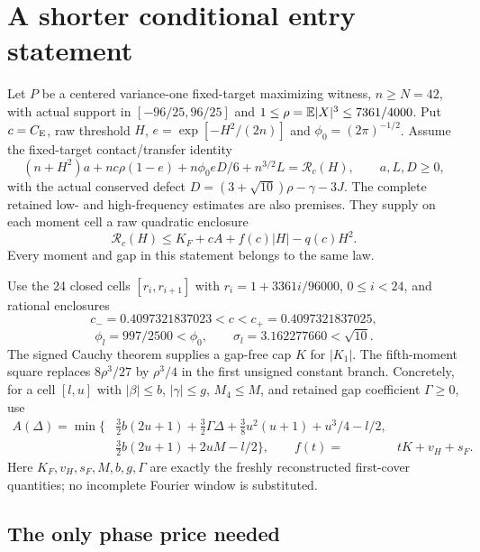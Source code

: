 \section{A shorter conditional entry statement}

Let $P$ be a centered variance-one fixed-target maximizing witness,
$n\ge N=42$, with actual support in $[-96/25,96/25]$ and
$1\le\rho=\mathbb E|X|^3\le7361/4000$. Put $c=C_{\mathrm E}$, raw threshold $H$,
$e=\exp[-H^2/(2n)]$ and $\phi_0=(2\pi)^{-1/2}$.
Assume the fixed-target contact/transfer identity
\begin{equation}\label{twopass:identity}
 (n+H^2)a+nc\rho(1-e)+n\phi_0 eD/6+n^{3/2}L=\mathcal R_c(H),
 \qquad a,L,D\ge0,
\end{equation}
with the actual conserved defect
$D=(3+\sqrt{10})\rho-\gamma-3J$.
The complete retained low- and high-frequency estimates are also premises.
They supply on each moment cell a raw quadratic enclosure
\begin{equation}\label{twopass:raw}
 \mathcal R_c(H)\le K_F+cA+f(c)|H|-q(c)H^2.
\end{equation}
Every moment and gap in this statement belongs to the same law.

Use the 24 closed cells $[r_i,r_{i+1}]$ with
$r_i=1+3361i/96000$, $0\le i<24$, and rational enclosures
\[
 c_-=0.4097321837023<c<c_+=0.4097321837025,
\]
\[
 \phi_l=997/2500<\phi_0,\qquad
 \sigma_l=3.162277660<\sqrt{10}.
\]
The signed Cauchy theorem supplies a gap-free cap $K$ for $|K_1|$.
The fifth-moment square replaces $8\rho^3/27$ by $\rho^3/4$ in the
first unsigned constant branch. Concretely, for a cell $[l,u]$ with
$|\beta|\le b$, $|\gamma|\le g$, $M_4\le M$, and retained gap coefficient
$\Gamma\ge0$, use
\begin{align*}
 A(\Delta)=\min\bigl\{&\tfrac32b(2u+1)+\tfrac32\Gamma\Delta
       +\tfrac38u^2(u+1)+u^3/4-l/2,\\
                     &\tfrac32b(2u+1)+2uM-l/2\bigr\},
 \qquad f(t)={}&tK+v_H+s_F.
\end{align*}
Here $K_F,v_H,s_F,M,b,g,\Gamma$ are exactly the freshly reconstructed
first-cover quantities; no incomplete Fourier window is substituted.

\subsection{The only phase price needed}

